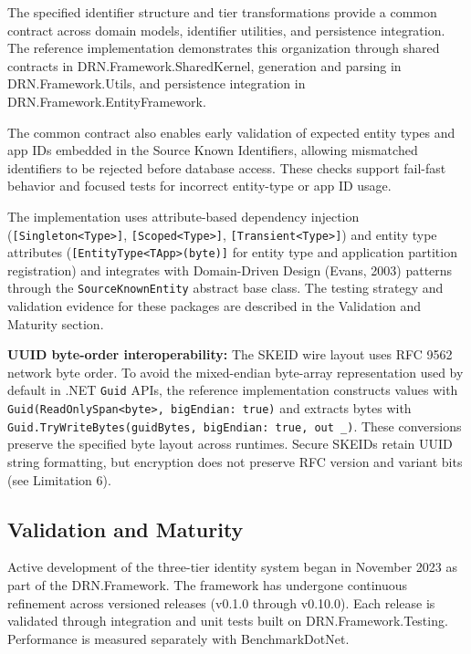 \documentclass[fleqn,10pt]{wlpeerj}
\begin{document}
The specified identifier structure and tier transformations provide a
common contract across domain models, identifier utilities, and
persistence integration. The reference implementation demonstrates this
organization through shared contracts in DRN.Framework.SharedKernel,
generation and parsing in DRN.Framework.Utils, and persistence
integration in DRN.Framework.EntityFramework.

The common contract also enables early validation of expected entity
types and app IDs embedded in the Source Known Identifiers, allowing
mismatched identifiers to be rejected before database access. These
checks support fail-fast behavior and focused tests for incorrect
entity-type or app ID usage.

The implementation uses attribute-based dependency injection
(\texttt{{[}Singleton\textless{}Type\textgreater{}{]}},
\texttt{{[}Scoped\textless{}Type\textgreater{}{]}},
\texttt{{[}Transient\textless{}Type\textgreater{}{]}}) and entity type
attributes (\texttt{{[}EntityType\textless{}TApp\textgreater{}(byte){]}}
for entity type and application partition registration) and integrates
with Domain-Driven Design (Evans, 2003) patterns through the
\texttt{SourceKnownEntity} abstract base class. The testing strategy and
validation evidence for these packages are described in the Validation
and Maturity section.

\textbf{UUID byte-order interoperability:} The SKEID wire layout uses
RFC 9562 network byte order. To avoid the mixed-endian byte-array
representation used by default in .NET \texttt{Guid} APIs, the reference
implementation constructs values with
\texttt{Guid(ReadOnlySpan\textless{}byte\textgreater{},\ bigEndian:\ true)}
and extracts bytes with
\texttt{Guid.TryWriteBytes(guidBytes,\ bigEndian:\ true,\ out\ \_)}.
These conversions preserve the specified byte layout across runtimes.
Secure SKEIDs retain UUID string formatting, but encryption does not
preserve RFC version and variant bits (see Limitation 6).

\subsection{Validation and Maturity}\label{validation-and-maturity}

Active development of the three-tier identity system began in November
2023 as part of the DRN.Framework. The framework has undergone
continuous refinement across versioned releases (v0.1.0 through
v0.10.0). Each release is validated through integration and unit tests
built on DRN.Framework.Testing. Performance is measured separately with
BenchmarkDotNet.
\end{document}
